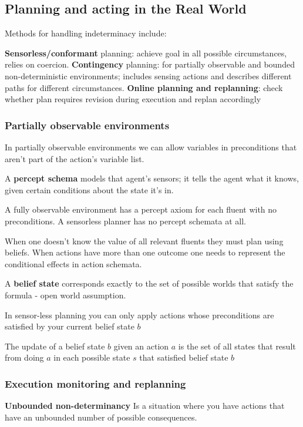 \documentclass{article}
\begin{document}
\subsection{Planning and acting in the Real World}


Methods for handling indeterminacy include:

\textbf{Sensorless/conformant} planning: achieve goal in all possible circumstances, relies on coercion. \textbf{Contingency} planning: for partially observable and bounded non-deterministic environments; includes sensing actions and describes different paths for different circumstances. \textbf{Online planning and replanning}: check whether plan requires revision during execution and replan accordingly

\subsubsection{Partially observable environments}

In partially observable environments we can allow variables in preconditions that aren't part of the action's variable list.

A \textbf{percept schema} models that agent's sensors; it tells the agent what it knows, given certain conditions about the state it's in. 

A fully observable environment has a percept axiom for each fluent with no preconditions. A sensorless planner has no percept schemata at all.

When one doesn't know the value of all relevant fluents they must plan using beliefs. When actions have more than one outcome one needs to represent the conditional effects in action schemata.

A \textbf{belief state} corresponds exactly to the set of possible worlds that satisfy the formula - open world assumption. 

In sensor-less planning you can only apply actions whose preconditions are satisfied by your current belief state $b$

The update of a belief state $b$ given an action $a$ is the set of all states that result from doing $a$ in each possible state $s$ that satisfied belief state $b$


 \subsubsection{Execution monitoring and replanning}

\textbf{Unbounded non-determinancy} Is a situation where you have actions that have an unbounded number of possible consequences. 
\end{document}

